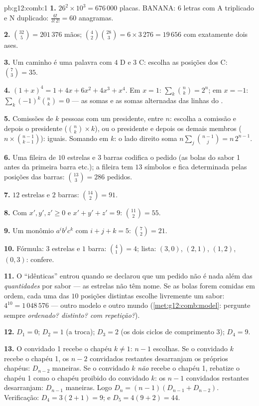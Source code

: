 \begin{solution}{pb:g12:comb:1}
\textbf{1.} $26^2 \times 10^3 = 676\,000$ placas. BANANA: $6$
letras com A triplicado e N duplicado:
$\frac{6!}{3!\,2!} = 60$ anagramas.

\textbf{2.} $\binom{32}{5} = 201\,376$ mãos;
$\binom42 \binom{28}{3} = 6 \times 3\,276 = 19\,656$ com
exatamente dois ases.

\textbf{3.} Um caminho é uma palavra com $4$ D e $3$ C: escolha
as posições dos C: $\binom73 = 35$.

\textbf{4.} $(1+x)^4 = 1 + 4x + 6x^2 + 4x^3 + x^4$. Em
$x = 1$: $\sum_k \binom nk = 2^n$; em $x = -1$:
$\sum_k (-1)^k \binom nk = 0$ --- as somas e as somas alternadas
das linhas do .

\textbf{5.} Comissões de $k$ pessoas com um presidente, entre
$n$: escolha a comissão e depois o presidente
($\binom nk \times k$), ou o presidente e depois os demais
membros ($n \times \binom{n-1}{k-1}$): iguais. Somando em $k$:
o lado direito soma $n \sum_j \binom{n-1}{j} = n\,2^{n-1}$.

\textbf{6.} Uma fileira de $10$ estrelas e $3$ barras codifica o
pedido (as bolas do sabor 1 antes da primeira barra etc.); a
fileira tem $13$ símbolos e fica determinada pelas posições das
barras: $\binom{13}{3} = 286$ pedidos.

\textbf{7.} $12$ estrelas e $2$ barras:
$\binom{14}{2} = 91$.

\textbf{8.} Com $x', y', z' \geq 0$ e $x' + y' + z' = 9$:
$\binom{11}{2} = 55$.

\textbf{9.} Um monômio $a^i b^j c^k$ com $i + j + k = 5$:
$\binom72 = 21$.

\textbf{10.} Fórmula: $3$ estrelas e $1$ barra:
$\binom41 = 4$; lista: $(3,0)$, $(2,1)$, $(1,2)$, $(0,3)$:
confere.

\textbf{11.} O ``idênticas'' entrou quando se declarou que um
pedido não é nada além das \emph{quantidades} por sabor --- as
estrelas não têm nome. Se as bolas forem comidas em ordem, cada
uma das $10$ posições distintas escolhe livremente um sabor:
$4^{10} = 1\,048\,576$  --- outro modelo e outro
mundo (\cref{met:g12:comb:model}: pergunte sempre
\emph{ordenado? distinto? com repetição?}).

\textbf{12.} $D_1 = 0$; $D_2 = 1$ (a troca); $D_3 = 2$ (os dois
ciclos de comprimento $3$); $D_4 = 9$.

\textbf{13.} O convidado 1 recebe o chapéu $k \neq 1$: $n - 1$
escolhas. Se o convidado $k$ recebe o chapéu 1, os $n - 2$
convidados restantes desarranjam os próprios chapéus:
$D_{n-2}$ maneiras. Se o convidado $k$ \emph{não} recebe o
chapéu 1, rebatize o chapéu 1 como o chapéu proibido do
convidado $k$: os $n - 1$ convidados restantes desarranjam:
$D_{n-1}$ maneiras. Logo $D_n = (n-1)(D_{n-1} + D_{n-2})$.
Verificação: $D_4 = 3(2 + 1) = 9$; e $D_5 = 4(9 + 2) = 44$.


\end{solution}
